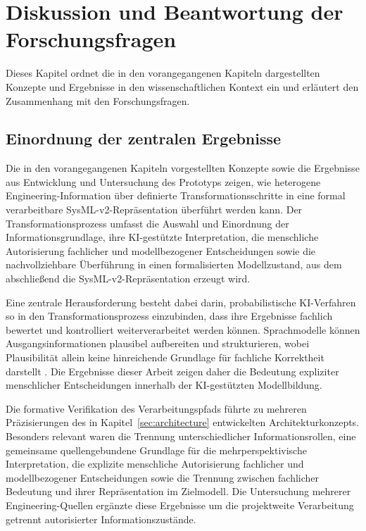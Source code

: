 \section{Diskussion und Beantwortung der Forschungsfragen}
\label{sec:discussion}

Dieses Kapitel ordnet die in den vorangegangenen Kapiteln dargestellten
Konzepte und Ergebnisse in den wissenschaftlichen Kontext ein und erläutert
den Zusammenhang mit den Forschungsfragen.

\subsection{Einordnung der zentralen Ergebnisse}
\label{sec:discussion_overview}

Die in den vorangegangenen Kapiteln vorgestellten Konzepte sowie die
Ergebnisse aus Entwicklung und Untersuchung des Prototyps zeigen, wie
heterogene Engineering-Information über definierte Transformationsschritte
in eine formal verarbeitbare SysML-v2-Repräsentation überführt werden kann.
Der Transformationsprozess umfasst die Auswahl und Einordnung der
Informationsgrundlage, ihre KI-gestützte Interpretation, die menschliche
Autorisierung fachlicher und modellbezogener Entscheidungen sowie die
nachvollziehbare Überführung in einen formalisierten Modellzustand, aus dem
abschließend die SysML-v2-Repräsentation erzeugt wird.

Eine zentrale Herausforderung besteht dabei darin, probabilistische
KI-Verfahren so in den Transformationsprozess einzubinden, dass ihre
Ergebnisse fachlich bewertet und kontrolliert weiterverarbeitet werden
können. Sprachmodelle können Ausgangsinformationen plausibel aufbereiten und
strukturieren, wobei Plausibilität allein keine hinreichende Grundlage für
fachliche Korrektheit darstellt
\cite{Topcu2025,Souza.2026}. Die Ergebnisse dieser Arbeit zeigen daher die
Bedeutung expliziter menschlicher Entscheidungen innerhalb der
KI-gestützten Modellbildung.

Die formative Verifikation des Verarbeitungspfads führte zu mehreren
Präzisierungen des in Kapitel~\ref{sec:architecture} entwickelten
Architekturkonzepts. Besonders relevant waren die Trennung unterschiedlicher
Informationsrollen, eine gemeinsame quellengebundene Grundlage für die
mehrperspektivische Interpretation, die explizite menschliche Autorisierung
fachlicher und modellbezogener Entscheidungen sowie die Trennung zwischen
fachlicher Bedeutung und ihrer Repräsentation im Zielmodell. Die
Untersuchung mehrerer Engineering-Quellen ergänzte diese Ergebnisse um die
projektweite Verarbeitung getrennt autorisierter Informationszustände.

